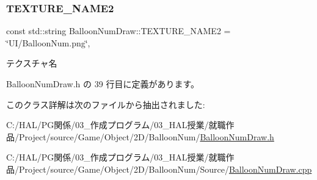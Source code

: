 \subsubsection{\texorpdfstring{T\+E\+X\+T\+U\+R\+E\+\_\+\+N\+A\+M\+E2}{TEXTURE\_NAME2}}
{\footnotesize\ttfamily const std\+::string Balloon\+Num\+Draw\+::\+T\+E\+X\+T\+U\+R\+E\+\_\+\+N\+A\+M\+E2 = \char`\"{}UI/Balloon\+Num.\+png\char`\"{}\hspace{0.3cm}{\ttfamily [static]}, {\ttfamily [private]}}



テクスチャ名 



 Balloon\+Num\+Draw.\+h の 39 行目に定義があります。



このクラス詳解は次のファイルから抽出されました\+:\begin{DoxyCompactItemize}
\item 
C\+:/\+H\+A\+L/\+P\+G関係/03\+\_\+作成プログラム/03\+\_\+\+H\+A\+L授業/就職作品/\+Project/source/\+Game/\+Object/2\+D/\+Balloon\+Num/\mbox{\hyperlink{_balloon_num_draw_8h}{Balloon\+Num\+Draw.\+h}}\item 
C\+:/\+H\+A\+L/\+P\+G関係/03\+\_\+作成プログラム/03\+\_\+\+H\+A\+L授業/就職作品/\+Project/source/\+Game/\+Object/2\+D/\+Balloon\+Num/\+Source/\mbox{\hyperlink{_balloon_num_draw_8cpp}{Balloon\+Num\+Draw.\+cpp}}\end{DoxyCompactItemize}
